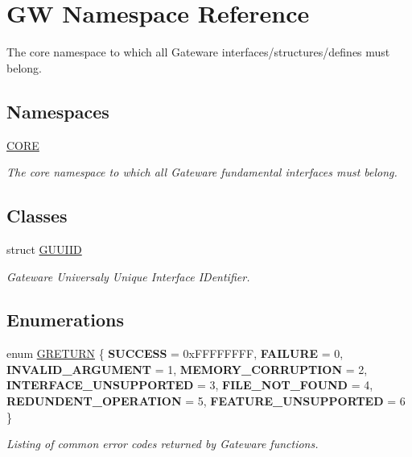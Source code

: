 \hypertarget{namespace_g_w}{}\section{GW Namespace Reference}
\label{namespace_g_w}


The core namespace to which all Gateware interfaces/structures/defines must belong.  


\subsection*{Namespaces}
\begin{DoxyCompactItemize}
\item 
 \hyperlink{namespace_g_w_1_1_c_o_r_e}{C\+O\+RE}
\begin{DoxyCompactList}\small\item\em The core namespace to which all Gateware fundamental interfaces must belong. \end{DoxyCompactList}\end{DoxyCompactItemize}
\subsection*{Classes}
\begin{DoxyCompactItemize}
\item 
struct \hyperlink{struct_g_w_1_1_g_u_u_i_i_d}{G\+U\+U\+I\+ID}
\begin{DoxyCompactList}\small\item\em Gateware Universaly Unique Interface I\+Dentifier. \end{DoxyCompactList}\end{DoxyCompactItemize}
\subsection*{Enumerations}
\begin{DoxyCompactItemize}
\item 
\hypertarget{namespace_g_w_a69b1aaebac1cac8049825f035884c95b}{}\label{namespace_g_w_a69b1aaebac1cac8049825f035884c95b} 
enum \hyperlink{namespace_g_w_a69b1aaebac1cac8049825f035884c95b}{G\+R\+E\+T\+U\+RN} \{ \newline
{\bfseries S\+U\+C\+C\+E\+SS} = 0x\+F\+F\+F\+F\+F\+F\+FF, 
{\bfseries F\+A\+I\+L\+U\+RE} = 0, 
{\bfseries I\+N\+V\+A\+L\+I\+D\+\_\+\+A\+R\+G\+U\+M\+E\+NT} = 1, 
{\bfseries M\+E\+M\+O\+R\+Y\+\_\+\+C\+O\+R\+R\+U\+P\+T\+I\+ON} = 2, 
\newline
{\bfseries I\+N\+T\+E\+R\+F\+A\+C\+E\+\_\+\+U\+N\+S\+U\+P\+P\+O\+R\+T\+ED} = 3, 
{\bfseries F\+I\+L\+E\+\_\+\+N\+O\+T\+\_\+\+F\+O\+U\+ND} = 4, 
{\bfseries R\+E\+D\+U\+N\+D\+E\+N\+T\+\_\+\+O\+P\+E\+R\+A\+T\+I\+ON} = 5, 
{\bfseries F\+E\+A\+T\+U\+R\+E\+\_\+\+U\+N\+S\+U\+P\+P\+O\+R\+T\+ED} = 6
 \}\begin{DoxyCompactList}\small\item\em Listing of common error codes returned by Gateware functions. \end{DoxyCompactList}
\end{DoxyCompactItemize}


